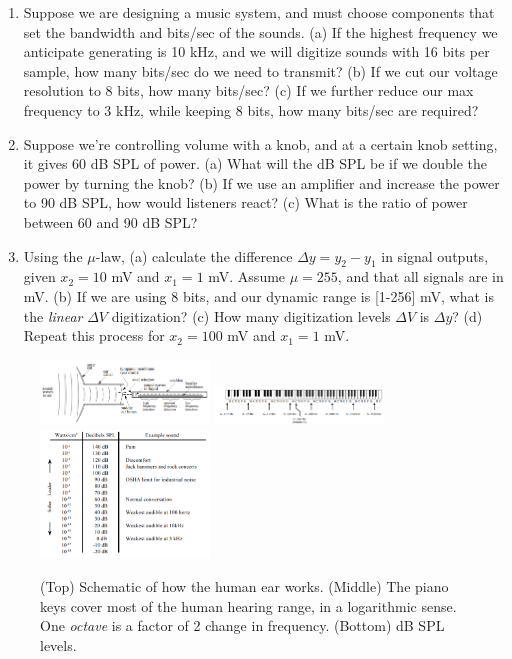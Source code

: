 \documentclass{article}
\begin{document}
\begin{enumerate}
\item Suppose we are designing a music system, and must choose components that set the bandwidth and bits/sec of the sounds. (a) If the highest frequency we anticipate generating is 10 kHz, and we will digitize sounds with 16 bits per sample, how many bits/sec do we need to transmit? (b) If we cut our voltage resolution to 8 bits, how many bits/sec? (c) If we further reduce our max frequency to 3 kHz, while keeping 8 bits, how many bits/sec are required? \\ \vspace{2.5cm}
\item Suppose we're controlling volume with a knob, and at a certain knob setting, it gives 60 dB SPL of power. (a) What will the dB SPL be if we double the power by turning the knob? (b) If we use an amplifier and increase the power to 90 dB SPL, how would listeners react? (c) What is the ratio of power between 60 and 90 dB SPL? \\ \vspace{2.5cm}
\item Using the $\mu$-law, (a) calculate the difference $\Delta y = y_2 - y_1$ in signal outputs, given $x_2 = 10$ mV and $x_1 = 1$ mV.  Assume $\mu = 255$, and that all signals are in mV. (b) If we are using 8 bits, and our dynamic range is [1-256] mV, what is the \textit{linear} $\Delta V$ digitization? (c) How many digitization levels $\Delta V$ is $\Delta y$? (d) Repeat this process for $x_2 = 100$ mV and $x_1 = 1$ mV.
\end{enumerate}

\begin{figure}
\centering
\includegraphics[width=0.4\textwidth]{audio_1.png}
\includegraphics[width=0.4\textwidth]{audio_4.png}
\includegraphics[width=0.4\textwidth]{audio_2.png}
\caption{\label{fig:1} (Top) Schematic of how the human ear works. (Middle) The piano keys cover most of the human hearing range, in a logarithmic sense.  One \textit{octave} is a factor of 2 change in frequency. (Bottom) dB SPL levels.}
\end{figure}
\end{document}
